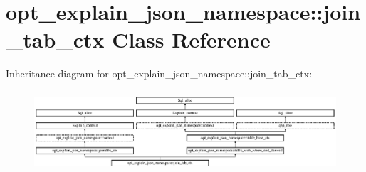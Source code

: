 \hypertarget{classopt__explain__json__namespace_1_1join__tab__ctx}{}\section{opt\+\_\+explain\+\_\+json\+\_\+namespace\+:\+:join\+\_\+tab\+\_\+ctx Class Reference}
\label{classopt__explain__json__namespace_1_1join__tab__ctx}
Inheritance diagram for opt\+\_\+explain\+\_\+json\+\_\+namespace\+:\+:join\+\_\+tab\+\_\+ctx\+:\begin{figure}[H]
\begin{center}
\leavevmode
\includegraphics[height=3.051771cm]{classopt__explain__json__namespace_1_1join__tab__ctx}
\end{center}
\end{figure}
